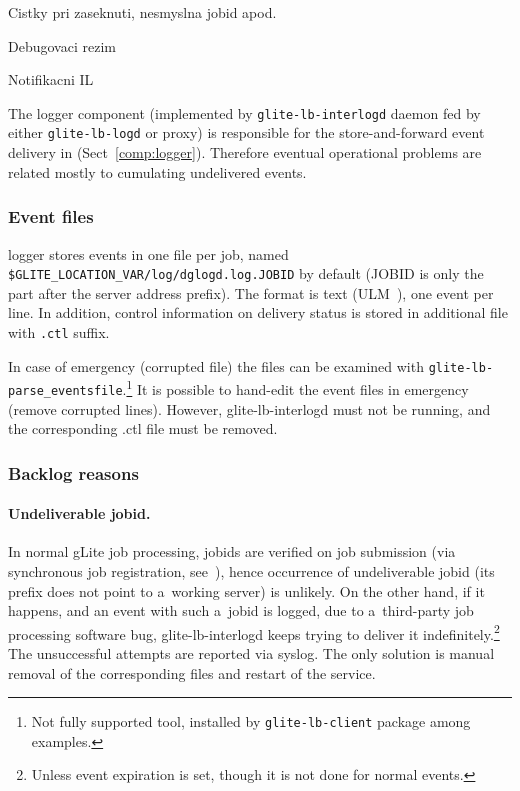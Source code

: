 Cistky pri zaseknuti, nesmyslna jobid apod.

Debugovaci rezim

Notifikacni IL
\fi

The logger component (implemented by \verb'glite-lb-interlogd' daemon fed by
either \verb'glite-lb-logd' or \LB proxy)
is responsible for the store-and-forward event delivery in \LB
(Sect~\ref{comp:logger}).
Therefore eventual operational problems are related mostly to 
cumulating undelivered events.

\subsubsection{Event files}

\LB logger stores events in one file per job, named
\verb'$GLITE_LOCATION_VAR/log/dglogd.log.JOBID' by default
(JOBID is only the part after the \LB server address prefix).
The format is text (ULM~\cite{ulm}), one event per line.
In addition, control information on delivery status is stored in additional
file with \verb'.ctl' suffix.

\begin{sloppypar}
In case of emergency (\eg corrupted file) the files can be examined
with \verb'glite-lb-parse_eventsfile'.\footnote{Not fully supported tool, installed
by \texttt{glite-lb-client} package among examples.}
It is possible to hand-edit the event files in emergency (remove corrupted lines).
However, glite-lb-interlogd must not be running, and the corresponding .ctl file
must be removed.
\end{sloppypar}

\subsubsection{Backlog reasons}

\paragraph{Undeliverable jobid.}
In normal gLite job processing, jobids are verified on job submission
(via synchronous job registration, see~\cite{lbug}), hence occurrence of
undeliverable jobid (\ie its prefix does not point to
a~working \LB server) is unlikely.
On the other hand, if it happens,
and an event with such a~jobid is logged,
\eg due to a~third-party job processing software bug,
glite-lb-interlogd keeps trying to deliver it indefinitely.\footnote{Unless
event expiration is set, though it is not done for normal events.}
The unsuccessful attempts are reported via syslog.
The only solution is manual
removal of the corresponding files
and restart of the service.

